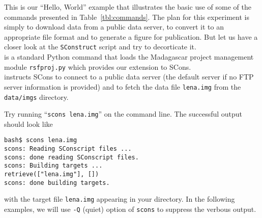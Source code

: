 %


This is our ``Hello, World'' example that illustrates the basic use of
some of the commands presented in Table~\ref{tbl:commands}. The plan
for this experiment is simply to download data from a public data
server, to convert it to an appropriate file format and to generate a
figure for publication. But let us have a closer look at the
\texttt{SConstruct} script and try to decorticate it.\\


%
is a standard Python command that loads the Madagascar project
management module \texttt{rsfproj.py} which provides our extension to
SCons.\\


%
instructs SCons to connect to a public data server (the default server
if no FTP server information is provided) and to fetch the data file
\texttt{lena.img} from the \texttt{data/imgs} directory. 
\begin{comment}
Note that
Madagascar expects a \texttt{data} folder on top of the specified
directory (i.e.  \texttt{imgs}). In the directory where you have your
SConstruct, running \texttt{scons lena.img} on the command line will
download the file \texttt{lena.img}.  The equivalent command lines are
\footnote{use login: anonymous, password: anonymous}
\begin{verbatim}
bash$ ftp egl.beg.utexas.edu
ftp> bin
ftp> cd data/imgs
ftp> get lena.img
ftp> bye
\end{verbatim}
\end{comment}
%
Try running ``\texttt{scons lena.img}'' on the command line. The successful output should look like
\begin{verbatim}
bash$ scons lena.img
scons: Reading SConscript files ...
scons: done reading SConscript files.
scons: Building targets ...
retrieve(["lena.img"], [])
scons: done building targets.
\end{verbatim}
with the target file \texttt{lena.img} appearing in your directory.
In the following examples, we will use \texttt{-Q} (quiet) option of
\texttt{scons} to suppress the verbous output.

